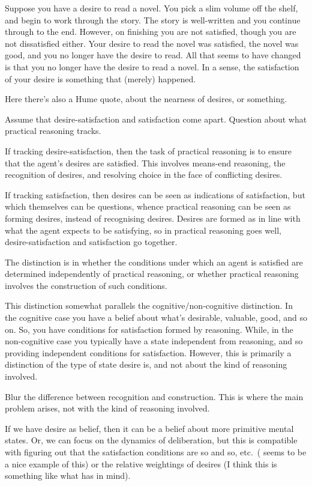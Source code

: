 \documentclass[10pt]{article}
\begin{document}
Suppose you have a desire to read a novel.
You pick a slim volume off the shelf, and begin to work through the story.
The story is well-written and you continue through to the end.
However, on finishing you are not satisfied, though you are not dissatisfied either.
Your desire to read the novel was satisfied, the novel was good, and you no longer have the desire to read.
All that seems to have changed is that you no longer have the desire to read a novel.
In a sense, the satisfaction of your desire is something that (merely) happened.

{\color{red}
  Here there's also a Hume quote, about the nearness of desires, or something.
}


Assume that desire-satisfaction and satisfaction come apart.
Question about what practical reasoning tracks.

If tracking desire-satisfaction, then the task of practical reasoning is to ensure that the agent's desires are satisfied.
This involves means-end reasoning, the recognition of desires, and resolving choice in the face of conflicting desires.

If tracking satisfaction, then desires can be seen as indications of satisfaction, but which themselves can be questions, whence practical reasoning can be seen as forming desires, instead of recognising desires.
Desires are formed as in line with what the agent expects to be satisfying, so in practical reasoning goes well, desire-satisfaction and satisfaction go together.

The distinction is in whether the conditions under which an agent is satisfied are determined independently of practical reasoning, or whether practical reasoning involves the construction of such conditions.

This distinction somewhat parallels the cognitive/non-cognitive distinction.
In the cognitive case you have a belief about what's desirable, valuable, good, and so on.
So, you have conditions for satisfaction formed by reasoning.
While, in the non-cognitive case you typically have a state independent from reasoning, and so providing independent conditions for satisfaction.
However, this is primarily a distinction of the type of state desire is, and not about the kind of reasoning involved.

Blur the difference between recognition and construction.
This is where the main problem arises, not with the kind of reasoning involved.

If we have desire as belief, then it can be a belief about more primitive mental states.
Or, we can focus on the dynamics of deliberation, but this is compatible with figuring out that the satisfaction conditions are so and so, etc.\ (\citeauthor{Bramble:2018aa} seems to be a nice example of this) or the relative weightings of desires (I think this is something like what \citeauthor{Schroeder:2007aa} has in mind).
\end{document}
